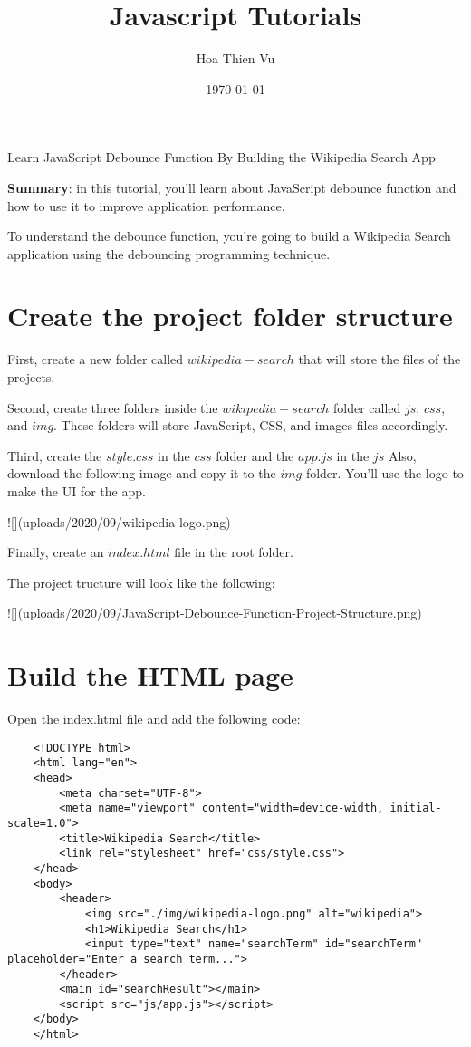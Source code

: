 \documentclass[11pt]{article}
\title{\textbf{Javascript Tutorials}}
\author{Hoa Thien Vu}
\date{\today}
\begin{document}
\maketitle

{\huge Learn JavaScript Debounce Function By Building the Wikipedia Search App}

\begin{displayquote}
\textbf{Summary}: in this tutorial, you'll learn about JavaScript debounce 
function and how to use it to improve application performance.
\end{displayquote}

\noindent
To understand the debounce function, you're going to build a Wikipedia
Search application using the debouncing programming technique.

\section*{Create the project folder structure}

First, create a new folder called $wikipedia-search$ that will store
the files of the projects.
\newline

\noindent
Second, create three folders inside the $wikipedia-search$ folder called
$js$, $css$, and $img$. These folders will store JavaScript, CSS, and
images files accordingly.
\newline

\noindent
Third, create the $style.css$ in the $css$ folder and the $app.js$ in
the $js$ Also, download the following image and copy it to the $img$
folder. You'll use the logo to make the UI for the app.

![](uploads/2020/09/wikipedia-logo.png)

\noindent
Finally, create an $index.html$ file in the root folder.
\newline

\noindent
The project tructure will look like the following:

![](uploads/2020/09/JavaScript-Debounce-Function-Project-Structure.png)

\section*{Build the HTML page}

Open the index.html file and add the following code:

\begin{lstlisting}
    <!DOCTYPE html>
    <html lang="en">
    <head>
        <meta charset="UTF-8">
        <meta name="viewport" content="width=device-width, initial-scale=1.0">
        <title>Wikipedia Search</title>
        <link rel="stylesheet" href="css/style.css">
    </head>
    <body>
        <header>
            <img src="./img/wikipedia-logo.png" alt="wikipedia">
            <h1>Wikipedia Search</h1>
            <input type="text" name="searchTerm" id="searchTerm" placeholder="Enter a search term...">
        </header>
        <main id="searchResult"></main>
        <script src="js/app.js"></script>
    </body>
    </html>
\end{lstlisting}
\end{document}
